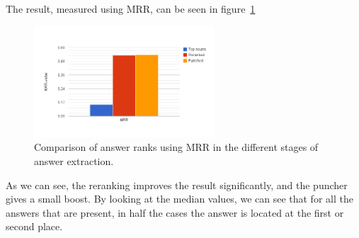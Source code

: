 The result, measured using MRR, can be seen in figure~\ref{fig:mrr}
\begin{figure}[h!]
  \centering
  \hspace*{-0.6cm}
  \includegraphics[width=0.6\textwidth]{figures/mrr.png}
  \caption{Comparison of answer ranks using MRR in the different stages of answer extraction.}
  \label{fig:mrr}
\end{figure}

As we can see, the reranking improves the result significantly, and the puncher gives a small boost.
By looking at the median values, we can see that for all the answers that are present, 
in half the cases the answer is located at the first or second place.
